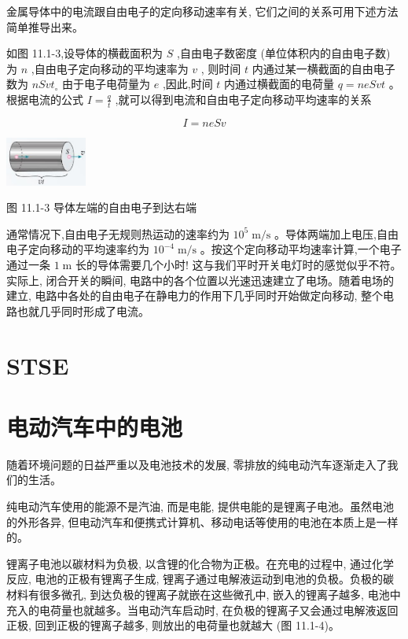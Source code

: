 \documentclass[10pt]{article}
\begin{document}
金属导体中的电流跟自由电子的定向移动速率有关, 它们之间的关系可用下述方法简单推导出来。

如图 11.1-3,设导体的横截面积为 \(S\) ,自由电子数密度 (单位体积内的自由电子数) 为 \(n\) ,自由电子定向移动的平均速率为 \(v\) , 则时间 \(t\) 内通过某一横截面的自由电子数为 \({nSv}{t}_{ \circ }\) 由于电子电荷量为 \(e\) ,因此,时间 \(t\) 内通过横截面的电荷量 \(q = {neSvt}\) 。根据电流的公式 \(I = \frac{q}{t}\) ,就可以得到电流和自由电子定向移动平均速率的关系

\[
I = {neSv}
\]

\begin{center}
\includegraphics[max width=0.2\textwidth]{images/01911d5f-8e38-70c0-b5b8-2b399bd115b6_60_288895.jpg}
\end{center}

图 11.1-3 导体左端的自由电子到达右端

通常情况下,自由电子无规则热运动的速率约为 \({10}^{5}\mathrm{\;m}/\mathrm{s}\) 。导体两端加上电压,自由电子定向移动的平均速率约为 \({10}^{-4}\mathrm{\;m}/\mathrm{s}\) 。按这个定向移动平均速率计算,一个电子通过一条 \(1\mathrm{\;m}\) 长的导体需要几个小时! 这与我们平时开关电灯时的感觉似乎不符。实际上, 闭合开关的瞬间, 电路中的各个位置以光速迅速建立了电场。随着电场的建立, 电路中各处的自由电子在静电力的作用下几乎同时开始做定向移动, 整个电路也就几乎同时形成了电流。

\section*{STSE}

\section*{电动汽车中的电池}

随着环境问题的日益严重以及电池技术的发展, 零排放的纯电动汽车逐渐走入了我们的生活。

纯电动汽车使用的能源不是汽油, 而是电能, 提供电能的是锂离子电池。虽然电池的外形各异, 但电动汽车和便携式计算机、移动电话等使用的电池在本质上是一样的。

锂离子电池以碳材料为负极, 以含锂的化合物为正极。在充电的过程中, 通过化学反应, 电池的正极有锂离子生成, 锂离子通过电解液运动到电池的负极。负极的碳材料有很多微孔, 到达负极的锂离子就嵌在这些微孔中, 嵌入的锂离子越多, 电池中充入的电荷量也就越多。当电动汽车启动时, 在负极的锂离子又会通过电解液返回正极, 回到正极的锂离子越多, 则放出的电荷量也就越大 (图 11.1-4)。
\end{document}
